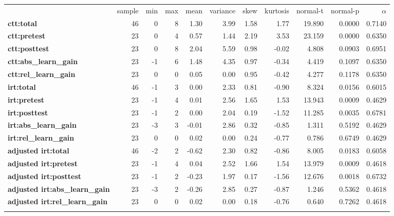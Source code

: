 \documentclass[]{article}
\begin{document}
\begin{longtable}[c]{@{}lrrrrrrrrrr@{}}
\toprule\addlinespace
& sample & min & max & mean & variance & skew & kurtosis & normal-t &
normal-p & $\alpha$
\\\addlinespace
\midrule\endhead
\textbf{ctt:total} & 46 & 0 & 8 & 1.30 & 3.99 & 1.58 & 1.77 & 19.890 &
0.0000 & 0.7140
\\\addlinespace
\textbf{ctt:pretest} & 23 & 0 & 4 & 0.57 & 1.44 & 2.19 & 3.53 & 23.159 &
0.0000 & 0.6350
\\\addlinespace
\textbf{ctt:posttest} & 23 & 0 & 8 & 2.04 & 5.59 & 0.98 & -0.02 & 4.808
& 0.0903 & 0.6951
\\\addlinespace
\textbf{ctt:abs\_learn\_gain} & 23 & -1 & 6 & 1.48 & 4.35 & 0.97 & -0.34
& 4.419 & 0.1097 & 0.6350
\\\addlinespace
\textbf{ctt:rel\_learn\_gain} & 23 & 0 & 0 & 0.05 & 0.00 & 0.95 & -0.42
& 4.277 & 0.1178 & 0.6350
\\\addlinespace
\textbf{irt:total} & 46 & -1 & 3 & 0.00 & 2.33 & 0.81 & -0.90 & 8.324 &
0.0156 & 0.6015
\\\addlinespace
\textbf{irt:pretest} & 23 & -1 & 4 & 0.01 & 2.56 & 1.65 & 1.53 & 13.943
& 0.0009 & 0.4629
\\\addlinespace
\textbf{irt:posttest} & 23 & -1 & 2 & 0.00 & 2.04 & 0.19 & -1.52 &
11.285 & 0.0035 & 0.6781
\\\addlinespace
\textbf{irt:abs\_learn\_gain} & 23 & -3 & 3 & -0.01 & 2.86 & 0.32 &
-0.85 & 1.311 & 0.5192 & 0.4629
\\\addlinespace
\textbf{irt:rel\_learn\_gain} & 23 & 0 & 0 & 0.02 & 0.00 & 0.24 & -0.77
& 0.786 & 0.6749 & 0.4629
\\\addlinespace
\textbf{adjusted irt:total} & 46 & -2 & 2 & -0.62 & 2.30 & 0.82 & -0.86
& 8.005 & 0.0183 & 0.6058
\\\addlinespace
\textbf{adjusted irt:pretest} & 23 & -1 & 4 & 0.04 & 2.52 & 1.66 & 1.54
& 13.979 & 0.0009 & 0.4618
\\\addlinespace
\textbf{adjusted irt:posttest} & 23 & -1 & 2 & -0.23 & 1.97 & 0.17 &
-1.56 & 12.676 & 0.0018 & 0.6732
\\\addlinespace
\textbf{adjusted irt:abs\_learn\_gain} & 23 & -3 & 2 & -0.26 & 2.85 &
0.27 & -0.87 & 1.246 & 0.5362 & 0.4618
\\\addlinespace
\textbf{adjusted irt:rel\_learn\_gain} & 23 & 0 & 0 & 0.02 & 0.00 & 0.18
& -0.76 & 0.640 & 0.7262 & 0.4618
\\\addlinespace
\bottomrule
\end{longtable}
\end{document}
